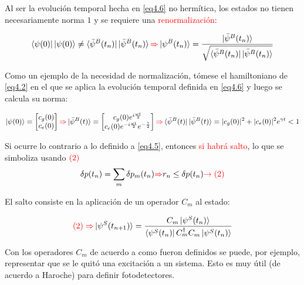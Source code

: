 \documentclass{book}
\begin{document}
Al ser la evolución temporal hecha en \ref{eq4.6} no hermítica, los estados no tienen necesariamente norma $1$ y se requiere una \textcolor{red}{renormalización}:

\begin{equation}\label{eq4.7}\bra{\psi(0)}\ket{\psi(0)}\neq\bra{\bar{\psi}^B(t_n)}\ket{\bar{\psi}^B(t_n)} \textcolor{red}{\Rightarrow} \ket{\psi^B(t_n)}=\frac{\ket{\bar{\psi}^B(t_n)}}{\sqrt{\bra{\bar{\psi}^B(t_n)}\ket{\bar{\psi}^B(t_n)}}}\end{equation}

Como un ejemplo de la necesidad de normalización, tómese el hamiltoniano de \ref{eq4.2} en el que se aplica la evolución temporal definida en \ref{eq4.6} y luego se calcula su norma:

\begin{equation}\label{eq4.8} \ket{\psi(0)}=\begin{bmatrix}c_g(0)\\c_e(0)\end{bmatrix}\textcolor{red}{\Rightarrow} \ket{\bar{\psi}^B(t)}=\begin{bmatrix}c_g(0)e^{i\frac{\omega t}{2}}\\c_e(0)e^{-i\frac{\omega t}{2}}e^{-\frac{\gamma}{2}}\end{bmatrix}\textcolor{red}{\Rightarrow} \bra{\bar{\psi}^B(t)}\ket{\bar{\psi}^B(t)}=\lvert c_g(0)\rvert^2+\lvert c_e(0)\rvert^2 e^{\gamma t} < 1 \end{equation}

Si ocurre lo contrario a lo definido a \ref{eq4.5}, entonces \textcolor{red}{si habrá salto}, lo que se simboliza usando $\textcolor{red}{(2)}$
\begin{equation}\label{eq4.9}\delta p(t_n)=\sum_m \delta p_m(t_n) \textcolor{red}{\Rightarrow} r_n \leq \delta p(t_n) \textcolor{red}{\rightarrow (2)} \end{equation}

El salto consiste en la aplicación de un operador $C_m$ al estado:

\begin{equation}\label{eq4.10}\textcolor{red}{(2)\Rightarrow}\ket{\psi^S(t_{n+1})}=\frac{C_m\ket{\psi^S(t_n)}}{\bra{\psi^S(t_n)}C_m^\dag C_m\ket{\psi^S(t_n)}}\end{equation}

Con los operadores $C_m$ de acuerdo a como fueron definidos se puede, por ejemplo, representar que se le quitó una excitación a un sistema. Esto es muy útil (de acuerdo a Haroche) para definir fotodetectores.
\end{document}
